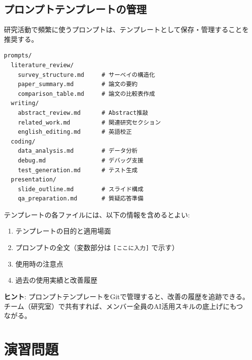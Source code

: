 \subsection{プロンプトテンプレートの管理}

研究活動で頻繁に使うプロンプトは、テンプレートとして保存・管理することを推奨する。

\begin{lstlisting}[language={}, caption=推奨フォルダ構成]
prompts/
  literature_review/
    survey_structure.md     # サーベイの構造化
    paper_summary.md        # 論文の要約
    comparison_table.md     # 論文の比較表作成
  writing/
    abstract_review.md      # Abstract推敲
    related_work.md         # 関連研究セクション
    english_editing.md      # 英語校正
  coding/
    data_analysis.md        # データ分析
    debug.md                # デバッグ支援
    test_generation.md      # テスト生成
  presentation/
    slide_outline.md        # スライド構成
    qa_preparation.md       # 質疑応答準備
\end{lstlisting}

テンプレートの各ファイルには、以下の情報を含めるとよい:
\begin{enumerate}
\item テンプレートの目的と適用場面
\item プロンプトの全文（変数部分は \texttt{[ここに入力]} で示す）
\item 使用時の注意点
\item 過去の使用実績と改善履歴
\end{enumerate}

\begin{screen}
\textbf{ヒント}: プロンプトテンプレートをGitで管理すると、改善の履歴を追跡できる。チーム（研究室）で共有すれば、メンバー全員のAI活用スキルの底上げにもつながる。
\end{screen}

\section*{演習問題}

